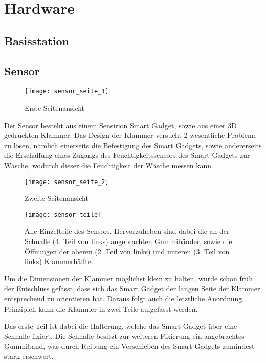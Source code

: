 \section{Hardware}

\subsection{Basisstation}

\newpage
\subsection{Sensor}

\begin{figure}[H] 
	\centerline{\texttt{[image: sensor\_seite\_1]}}
	\caption{Erste Seitenansicht}
	\label{sensor_seite_1}
\end{figure}

Der Sensor besteht aus einem Sensirion Smart Gadget, sowie aus einer 3D gedruckten Klammer. Das Design der Klammer versucht 2 wesentliche Probleme zu lösen, nämlich einerseits die Befestigung des Smart Gadgets, sowie andererseits die Erschaffung eines Zugangs des Feuchtigkeitssensors des Smart Gadgets zur Wäsche, wodurch dieser die Feuchtigkeit der Wäsche messen kann.

\newpage
\begin{figure}[H] 
	\centerline{\texttt{[image: sensor\_seite\_2]}}
	\caption{Zweite Seitenansicht}
	\label{sensor_seite_2}
\end{figure}

\begin{figure}[H] 
	\centerline{\texttt{[image: sensor\_teile]}}
	\caption{Alle Einzelteile des Sensors. Hervorzuheben sind dabei die an der Schnalle (4. Teil von links) angebrachten Gummibänder, sowie die Öffnungen der oberen (2. Teil von links) und unteren (3. Teil von links) Klammerhälfte.}
	\label{sensor_teile}
\end{figure}

Um die Dimensionen der Klammer möglichst klein zu halten, wurde schon früh der Entschluss gefasst, dass sich das Smart Gadget der langen Seite der Klammer entsprechend zu orientieren hat. Daraus folgt auch die letztliche Anordnung. Prinzipiell kann die Klammer in zwei Teile aufgefasst werden.

Das erste Teil ist dabei die Halterung, welche das Smart Gadget über eine Schnalle fixiert. Die Schnalle besitzt zur weiteren Fixierung ein angebrachtes Gummiband, was durch Reibung ein Verschieben des Smart Gadgets zumindest stark erschwert.

